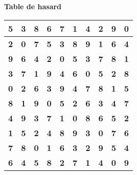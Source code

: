 \documentclass[10pt]{book}
\begin{document}
\pagestyle{endmatterstyle}
\begin{center}
  \textbf{\Large Table de hasard}\\[1.6cm]
  {
    \renewcommand\arraystretch{2.6}
    \begin{tabular}{|c|c|c|c|c|c|c|c|c|c|}
      \hline
      \huge\textbf{5} & \huge\textbf{3} & \huge\textbf{8} & \huge\textbf{6} & \huge\textbf{7} & \huge\textbf{1} & \huge\textbf{4} & \huge\textbf{2} & \huge\textbf{9} & \huge\textbf{0} \\ \hline
      \huge\textbf{2} & \huge\textbf{0} & \huge\textbf{7} & \huge\textbf{5} & \huge\textbf{3} & \huge\textbf{8} & \huge\textbf{9} & \huge\textbf{1} & \huge\textbf{6} & \huge\textbf{4} \\ \hline
      \huge\textbf{9} & \huge\textbf{6} & \huge\textbf{4} & \huge\textbf{2} & \huge\textbf{0} & \huge\textbf{5} & \huge\textbf{3} & \huge\textbf{7} & \huge\textbf{8} & \huge\textbf{1} \\ \hline
      \huge\textbf{3} & \huge\textbf{7} & \huge\textbf{1} & \huge\textbf{9} & \huge\textbf{4} & \huge\textbf{6} & \huge\textbf{0} & \huge\textbf{5} & \huge\textbf{2} & \huge\textbf{8} \\ \hline
      \huge\textbf{0} & \huge\textbf{2} & \huge\textbf{6} & \huge\textbf{3} & \huge\textbf{9} & \huge\textbf{4} & \huge\textbf{7} & \huge\textbf{8} & \huge\textbf{1} & \huge\textbf{5} \\ \hline
      \huge\textbf{8} & \huge\textbf{1} & \huge\textbf{9} & \huge\textbf{0} & \huge\textbf{5} & \huge\textbf{2} & \huge\textbf{6} & \huge\textbf{3} & \huge\textbf{4} & \huge\textbf{7} \\ \hline
      \huge\textbf{4} & \huge\textbf{9} & \huge\textbf{3} & \huge\textbf{7} & \huge\textbf{1} & \huge\textbf{0} & \huge\textbf{8} & \huge\textbf{6} & \huge\textbf{5} & \huge\textbf{2} \\ \hline
      \huge\textbf{1} & \huge\textbf{5} & \huge\textbf{2} & \huge\textbf{4} & \huge\textbf{8} & \huge\textbf{9} & \huge\textbf{3} & \huge\textbf{0} & \huge\textbf{7} & \huge\textbf{6} \\ \hline
      \huge\textbf{7} & \huge\textbf{8} & \huge\textbf{0} & \huge\textbf{1} & \huge\textbf{6} & \huge\textbf{3} & \huge\textbf{2} & \huge\textbf{9} & \huge\textbf{5} & \huge\textbf{4} \\ \hline
      \huge\textbf{6} & \huge\textbf{4} & \huge\textbf{5} & \huge\textbf{8} & \huge\textbf{2} & \huge\textbf{7} & \huge\textbf{1} & \huge\textbf{4} & \huge\textbf{0} & \huge\textbf{9} \\ \hline
    \end{tabular}
  }
\end{center}
    
\end{document}
